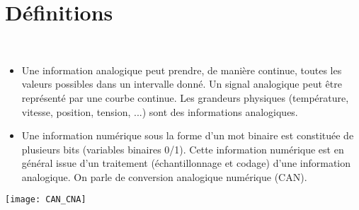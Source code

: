 \fichetrue
\proftrue
\tdfalse
\coursfalse



\def\xxnumchapitre{Révisions 1 \vspace{.2cm}}
\def\xxchapitre{\hspace{.12cm} Définitions préliminaires et détermination des performances}

\def\xxposongletx{2}
\def\xxposonglettext{1.45}
\def\xxposonglety{19}%

\def\xxonglet{Cy 01 -- Rév 1}

\def\xxactivite{Fiche}


\def\xxpied{%
Cycle 01 -- Modéliser le comportement des systèmes multiphysiques\\
Révision 1 -- \xxactivite%
}

\setcounter{secnumdepth}{5}



\vspace{.5cm}
\pagestyle{fancy}
\thispagestyle{plain}
\setcounter{section}{0}

\section{Définitions}



\begin{defi} ~\\
\begin{itemize}[label=,font=\color{ocre}] 
\item Une information analogique peut prendre, de manière continue, toutes les valeurs
possibles dans un intervalle donné. Un signal analogique peut être représenté
par une courbe continue. Les grandeurs physiques (température, vitesse,
position, tension, ...) sont des informations analogiques.

\item Une information numérique sous la forme d'un mot binaire est constituée de
plusieurs bits (variables binaires 0/1). Cette information numérique est en
général issue d'un traitement (échantillonnage et codage) d'une information
analogique. On parle de conversion analogique numérique (CAN).
\end{itemize}
\end{defi}

\begin{center}
\texttt{[image: CAN\_CNA]}

\end{center}



